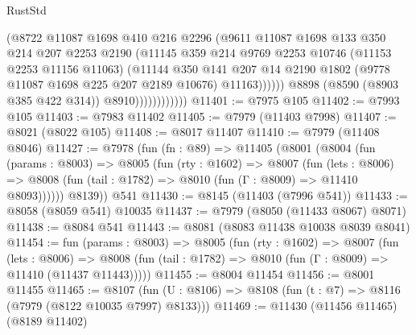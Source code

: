 \begin{lexlean}{RustStd}
\begin{coremodule}
                                (@8722
                                  @11087
                                  @1698
                                  @410
                                  @216
                                  @2296
                                  (@9611
                                    @11087
                                    @1698
                                    @133
                                    @350
                                    @214
                                    @207
                                    @2253
                                    @2190
                                    (@11145
                                      @359
                                      @214
                                      @9769
                                      @2253
                                      @10746
                                      (@11153 @2253 @11156 @11063)
                                      (@11144
                                        @350
                                        @141
                                        @207
                                        @14
                                        @2190
                                        @1802
                                        (@9778 @11087 @1698 @225 @207 @2189 @10676)
                                        @11163))))))
                            @8898
                            (@8590 (@8903 @385 @422 @314))
                            @8910))))))))))))
@11401 := @7975 @105
@11402 := @7993 @105
@11403 := @7983 @11402
@11405 := @7979 (@11403 @7998)
@11407 := @8021 (@8022 @105)
@11408 := @8017 @11407
@11410 := @7979 (@11408 @8046)
@11427 := @7978
    (fun (fn : @89) =>
    @11405
      (@8001
        (@8004
          (fun (params : @8003) =>
          @8005
            (fun (rty : @1602) =>
            @8007
              (fun (lets : @8006) =>
              @8008 (fun (tail : @1782) => @8010 (fun (Γ : @8009) => @11410 @8093))))))
        @8139))
    @541
@11430 := @8145 (@11403 (@7996 @541))
@11433 := @8058 (@8059 @541) @10035
@11437 := @7979 (@8050 (@11433 @8067) @8071)
@11438 := @8084 @541
@11443 := @8081 (@8083 @11438 @10038 @8039 @8041)
@11454 := fun (params : @8003) =>
  @8005
    (fun (rty : @1602) =>
    @8007
      (fun (lets : @8006) =>
      @8008 (fun (tail : @1782) => @8010 (fun (Γ : @8009) => @11410 (@11437 @11443)))))
@11455 := @8004 @11454
@11456 := @8001 @11455
@11465 := @8107
    (fun (U : @8106) => @8108 (fun (t : @7) => @8116 (@7979 (@8122 @10035 @7997) @8133)))
@11469 := @11430 (@11456 @11465) (@8189 @11402)

\end{coremodule}
\end{lexlean}
